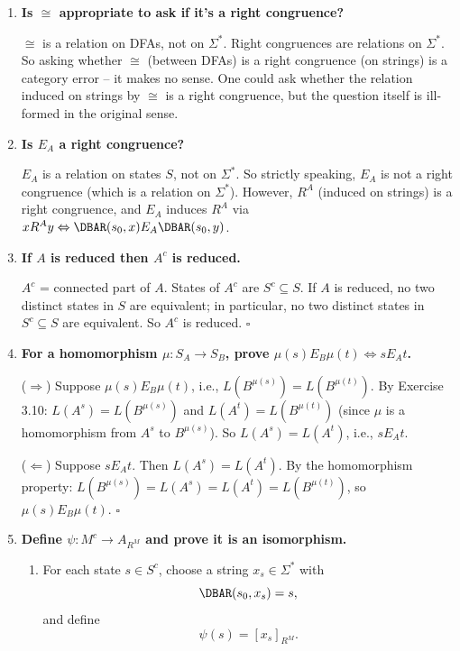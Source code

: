 \begin{enumerate}[{3.}1.]
\item \textbf{Is $\cong$ appropriate to ask if it's a right congruence?}

$\cong$ is a relation on DFAs, not on $\Sigma^*$. Right congruences are relations on $\Sigma^*$. So asking whether $\cong$ (between DFAs) is a right congruence (on strings) is a category error -- it makes no sense. One could ask whether the relation induced on strings by $\cong$ is a right congruence, but the question itself is ill-formed in the original sense.

\item \textbf{Is $E_A$ a right congruence?}

$E_A$ is a relation on states $S$, not on $\Sigma^*$. So strictly speaking, $E_A$ is not a right congruence (which is a relation on $\Sigma^*$). However, $R^A$ (induced on strings) is a right congruence, and $E_A$ induces $R^A$ via $x R^A y\Leftrightarrow\DBAR(s_0,x) E_A \DBAR(s_0,y)$.

\item \textbf{If $A$ is reduced then $A^c$ is reduced.}

$A^c$ = connected part of $A$. States of $A^c$ are $S^c\subseteq S$. If $A$ is reduced, no two distinct states in $S$ are equivalent; in particular, no two distinct states in $S^c\subseteq S$ are equivalent. So $A^c$ is reduced. $\square$

\item \textbf{For a homomorphism $\mu: S_A\to S_B$, prove $\mu(s) E_B \mu(t)\Leftrightarrow s E_A t$.}

($\Rightarrow$) Suppose $\mu(s) E_B \mu(t)$, i.e., $L(B^{\mu(s)})=L(B^{\mu(t)})$. By Exercise 3.10: $L(A^s)=L(B^{\mu(s)})$ and $L(A^t)=L(B^{\mu(t)})$ (since $\mu$ is a homomorphism from $A^s$ to $B^{\mu(s)}$). So $L(A^s)=L(A^t)$, i.e., $s E_A t$.

($\Leftarrow$) Suppose $s E_A t$. Then $L(A^s)=L(A^t)$. By the homomorphism property: $L(B^{\mu(s)})=L(A^s)=L(A^t)=L(B^{\mu(t)})$, so $\mu(s) E_B \mu(t)$. $\square$

\item \textbf{Define $\psi: M^c\to A_{R^M}$ and prove it is an isomorphism.}

\begin{enumerate}
\item For each state $s\in S^c$, choose a string $x_s\in\Sigma^*$ with
\[
\DBAR(s_0,x_s)=s,
\]
and define
\[
\psi(s)=[x_s]_{R^M}.
\]


\end{enumerate}
\end{enumerate}

